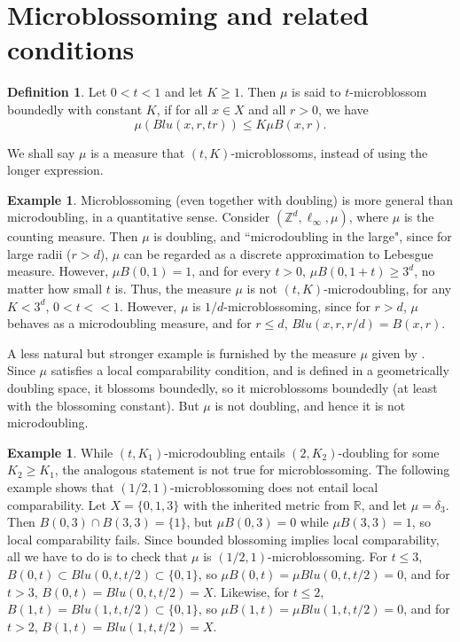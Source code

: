 \documentclass[12pt]{amsart}
\theoremstyle{definition}
\newtheorem{definition}[theorem]{Definition}
\newtheorem{example}[theorem]{Example}
\theoremstyle{parrafo}
\begin{document}
\section{Microblossoming and related conditions}


 \begin{definition} \label{bmicroblu} Let $0 < t <  1$ and let $K\ge 1$. Then 
  $\mu$ is said to $t$-microblossom boundedly   with constant $K$,
   if for all $x \in X$ and all $r >0$,
we have
\begin{equation}
\mu (Blu \left(x, r,  t r \right)) \le K \mu B(x,r).
\end{equation}
\end{definition}


We shall say $\mu$  is a measure that $(t,K)$-microblossoms, instead of using the longer
expression.

 \begin{example} \label{bmicrobluex} 
  Microblossoming (even together with doubling) is  more general than microdoubling,
 in a quantitative sense. Consider  $(\mathbb{Z}^d, \ell_\infty, \mu)$, where $\mu$ is
 the counting measure. Then $\mu$ is doubling, and ``microdoubling in the large", since for
 large radii ($r > d$), $\mu$ can be regarded as a discrete approximation to Lebesgue measure.
 However,
 $\mu B(0,1) = 1$, and for every $t > 0$, $\mu B(0,1 + t ) \ge 3^d$, no matter how small
 $t$ is. Thus,  the measure $\mu$ is not $(t,K)$-microdoubling, for any $K < 3^d$, $0 < t << 1$. However,
 $\mu$ is $1/d$-microblossoming, since for $r > d$, $\mu$ behaves as a microdoubling 
 measure, and for $r \le d$, $Blu(x, r, r/d) = B(x,r)$.
 
 A less natural but stronger example is furnished by the measure $\mu$ given by
 \cite[Theorem 5.9]{A2}. Since $\mu$ satisfies a local comparability condition,
 and is defined in a geometrically doubling space, it blossoms boundedly, so it
 microblossoms boundedly (at least with the blossoming constant). But $\mu$  is not doubling,
 and hence it is not microdoubling. 
 \end{example}
 
 \begin{example} \label{bmicroblunonblu} While $(t,K_1)$-microdoubling entails
 $(2, K_2)$-doubling for some $K_2 \ge K_1$, the analogous statement is not true
 for microblossoming.  The following  example shows that $(1/2,1)$-microblossoming
 does not entail local comparability.
 Let $X = \{0, 1, 3\}$ with the inherited metric from $\mathbb{R}$, and let $\mu = \delta_3$.
 Then $B(0,3) \cap B(3, 3) = \{1\}$, but $\mu B(0,3) = 0$ while $\mu B(3,3) = 1$, so 
 local comparability fails. Since bounded blossoming
 implies local comparability, all we have to do is to check that $\mu$ is $(1/2,1)$-microblossoming.
 For $t\le 3$, $B(0,t) \subset Blu(0, t, t/2) \subset \{0,1\}$, so  $\mu B(0,t) = \mu Blu(0, t, t/2)= 0$,
 and for $t > 3$,  $B(0,t) =  Blu(0, t, t/2) = X$. Likewise, for $t\le 2$, $B(1,t) = Blu(1, t, t/2) \subset \{0,1\}$, so  
$\mu B(1,t) = \mu Blu(1, t, t/2)= 0$,
 and for $t > 2$,  $B(1,t) =  Blu(1, t, t/2) = X$.
 \end{example}
\end{document}
